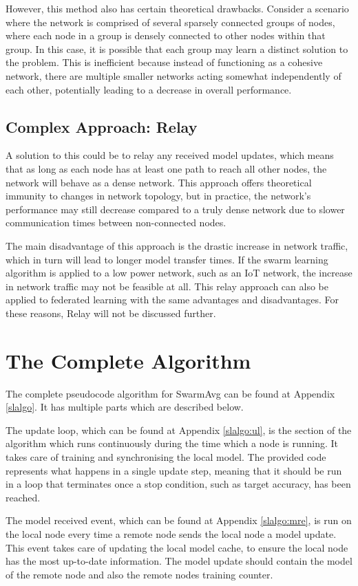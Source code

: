However, this method also has certain theoretical drawbacks. Consider a scenario where the network is comprised of several sparsely connected groups of nodes, where each node in a group is densely connected to other nodes within that group. In this case, it is possible that each group may learn a distinct solution to the problem. This is inefficient because instead of functioning as a cohesive network, there are multiple smaller networks acting somewhat independently of each other, potentially leading to a decrease in overall performance.


\subsection{Complex Approach: Relay} \label{relay}
A solution to this could be to relay any received model updates, which means that as long as each node has at least one path to reach all other nodes, the network will behave as a dense network. This approach offers theoretical immunity to changes in network topology, but in practice, the network's performance may still decrease compared to a truly dense network due to slower communication times between non-connected nodes.

The main disadvantage of this approach is the drastic increase in network traffic, which in turn will lead to longer model transfer times. If the swarm learning algorithm is applied to a low power network, such as an IoT network, the increase in network traffic may not be feasible at all. This relay approach can also be applied to federated learning with the same advantages and disadvantages. For these reasons, Relay will not be discussed further.

\section{The Complete Algorithm}
The complete pseudocode algorithm for SwarmAvg can be found at Appendix \ref{slalgo}. It has multiple parts which are described below.

The update loop, which can be found at Appendix \ref{slalgo:ul}, is the section of the algorithm which runs continuously during the time which a node is running. It takes care of training and synchronising the local model. The provided code represents what happens in a single update step, meaning that it should be run in a loop that terminates once a stop condition, such as target accuracy, has been reached.

The model received event, which can be found at Appendix \ref{slalgo:mre}, is run on the local node every time a remote node sends the local node a model update. This event takes care of updating the local model cache, to ensure the local node has the most up-to-date information. The model update should contain the model of the remote node and also the remote nodes training counter.
